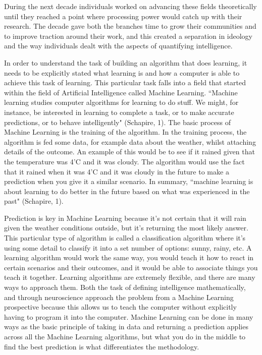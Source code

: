 \documentclass[11pt, oneside]{article}
\begin{document}
\par During the next decade individuals worked on advancing these fields theoretically until they reached a point where processing power would catch up with their research. The decade gave both the branches time to grow their communities and to improve traction around their work, and this created a separation in ideology and the way individuals dealt with the aspects of quantifying intelligence. 


\par In order to understand the task of building an algorithm that does learning, it needs to be explicitly stated what learning is and how a computer is able to achieve this task of learning. This particular task falls into a field that started within the field of Artificial Intelligence called Machine Learning. ``Machine learning studies computer algorithms for learning to do stuff. We might, for instance, be interested in learning to complete a task, or to make accurate predictions, or to behave intelligently" (Schapire, 1). The basic process of Machine Learning is the training of the algorithm. In the training process, the algorithm is fed some data, for example data about the weather, whilst attaching details of the outcome. An example of this would be to see if it rained given that the temperature was 4'C and it was cloudy. The algorithm would use the fact that it rained when it was 4'C and it was cloudy in the future to make a prediction when you give it a similar scenario. In summary, ``machine learning is about learning to do better in the future based on what was experienced in the past" (Schapire, 1).

\par Prediction is key in Machine Learning because it's not certain that it will rain given the weather conditions outside, but it's returning the most likely answer. This particular type of algorithm is called a classification algorithm where it's using some detail to classify it into a set number of options: sunny, rainy, etc. A learning algorithm would work the same way, you would teach it how to react in certain scenarios and their outcomes, and it would be able to associate things you teach it together. Learning algorithms are extremely flexible, and there are many ways to approach them. Both the task of defining intelligence mathematically, and through neuroscience approach the problem from a Machine Learning prospective because this allows us to teach the computer without explicitly having to program it into the computer. Machine Learning can be done in many ways as the basic principle of taking in data and returning a prediction applies across all the Machine Learning algorithms, but what you do in the middle to find the best prediction is what differentiates the methodology. 
\end{document}
